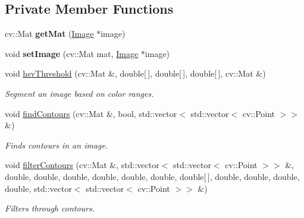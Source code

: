 \subsection*{Private Member Functions}
\begin{DoxyCompactItemize}
\item 
\mbox{\label{classBlobDetectorAdapater_a8c71f0f6253daf534c338bba8e5aea85}} 
cv\+::\+Mat {\bfseries get\+Mat} (\hyperlink{classImage}{Image} $\ast$image)
\item 
\mbox{\label{classBlobDetectorAdapater_aa9742425b9a1b8492a16a2ea20d115f8}} 
void {\bfseries set\+Image} (cv\+::\+Mat mat, \hyperlink{classImage}{Image} $\ast$image)
\item 
void \hyperlink{classBlobDetectorAdapater_ad6089c689fcfb884fc32ca4e3676f6ec}{hsv\+Threshold} (cv\+::\+Mat \&, double\mbox{[}$\,$\mbox{]}, double\mbox{[}$\,$\mbox{]}, double\mbox{[}$\,$\mbox{]}, cv\+::\+Mat \&)
\begin{DoxyCompactList}\small\item\em Segment an image based on color ranges. \end{DoxyCompactList}\item 
void \hyperlink{classBlobDetectorAdapater_aef56ed7c89479ff1a5b771e48738ce21}{find\+Contours} (cv\+::\+Mat \&, bool, std\+::vector$<$ std\+::vector$<$ cv\+::\+Point $>$$>$ \&)
\begin{DoxyCompactList}\small\item\em Finds contours in an image. \end{DoxyCompactList}\item 
void \hyperlink{classBlobDetectorAdapater_a5a627a8ae0ac83881e70ee096c69bdbd}{filter\+Contours} (cv\+::\+Mat \&, std\+::vector$<$ std\+::vector$<$ cv\+::\+Point $>$$>$ \&, double, double, double, double, double, double, double\mbox{[}$\,$\mbox{]}, double, double, double, double, std\+::vector$<$ std\+::vector$<$ cv\+::\+Point $>$$>$ \&)
\begin{DoxyCompactList}\small\item\em Filters through contours. \end{DoxyCompactList}\end{DoxyCompactItemize}
